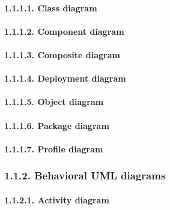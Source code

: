 \documentclass[
]{article}
\begin{document}
\hypertarget{class-diagram}{%
\paragraph{1.1.1.1. Class diagram}\label{class-diagram}}

\hypertarget{component-diagram}{%
\paragraph{1.1.1.2. Component diagram}\label{component-diagram}}

\hypertarget{composite-diagram}{%
\paragraph{1.1.1.3. Composite diagram}\label{composite-diagram}}

\hypertarget{deployment-diagram}{%
\paragraph{1.1.1.4. Deployment diagram}\label{deployment-diagram}}

\hypertarget{object-diagram}{%
\paragraph{1.1.1.5. Object diagram}\label{object-diagram}}

\hypertarget{package-diagram}{%
\paragraph{1.1.1.6. Package diagram}\label{package-diagram}}

\hypertarget{profile-diagram}{%
\paragraph{1.1.1.7. Profile diagram}\label{profile-diagram}}

\hypertarget{behavioral-uml-diagrams}{%
\subsubsection{1.1.2. Behavioral UML
diagrams}\label{behavioral-uml-diagrams}}

\hypertarget{activity-diagram}{%
\paragraph{1.1.2.1. Activity diagram}\label{activity-diagram}}
\end{document}

